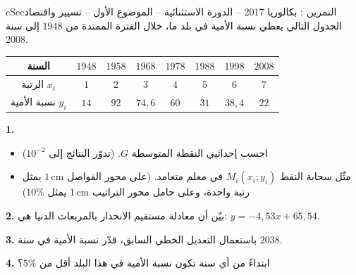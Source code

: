 \documentclass[12pt,a4paper]{article}
\newenvironment{BOX}[2]{\begin{otherlanguage}{english}\begin{arbox}{#1}{#2}}{\end{arbox}\end{otherlanguage}}
\newcounter{exo}
\newenvironment{tamrin}[1]{\stepcounter{exo}\begin{BOX}{cSec}{التمرين \theexo: #1}}{\end{BOX}}
\newenvironment{sq}{\begin{itemize}[leftmargin=2.4em,itemsep=3pt]}{\end{itemize}}
\newcommand{\qa}{\item[(أ)]}\newcommand{\qb}{\item[(ب)]}\newcommand{\qc}{\item[(جـ)]}\newcommand{\qd}{\item[(د)]}\newcommand{\qe}{\item[(هـ)]}
\newcommand{\QQ}[1]{\par\smallskip\textbf{#1.} }
\begin{document}
\begin{tamrin}{بكالوريا 2017 -- الدورة الاستثنائية -- الموضوع الأول -- تسيير واقتصاد}
الجدول التالي يعطي نسبة الأمية في بلد ما، خلال الفترة الممتدة من $1948$ إلى سنة $2008$.
\begin{center}
\begin{tabular}{|C|c|c|c|c|c|c|c|}\hline
{} السنة & $1948$ & $1958$ & $1968$ & $1978$ & $1988$ & $1998$ & $2008$\\\hline
الرتبة $x_i$ & $1$ & $2$ & $3$ & $4$ & $5$ & $6$ & $7$\\\hline
نسبة الأمية $y_i$ & $14$ & $92$ & $74{,}6$ & $60$ & $31$ & $38{,}4$ & $22$\\\hline
\end{tabular}
\end{center}

\QQ{1}
\begin{sq}
\qa احسب إحداثيي النقطة المتوسطة $G$. (تدوّر النتائج إلى $10^{-2}$)
\qb مثّل سحابة النقط $M_i(x_i;y_i)$ في معلم متعامد. (على محور الفواصل $1\,\text{cm}$ يمثل رتبة واحدة، وعلى حامل محور التراتيب $1\,\text{cm}$ يمثل $10\%$)
\end{sq}
\QQ{2} بيّن أن معادلة مستقيم الانحدار بالمربعات الدنيا هي: $y=-4{,}53x+65{,}54$.
\QQ{3} باستعمال التعديل الخطي السابق، قدّر نسبة الأمية في سنة $2038$.
\QQ{4} ابتداءً من أي سنة تكون نسبة الأمية في هذا البلد أقل من $5\%$؟
\end{tamrin}
\Needspace{15cm}
\end{document}
